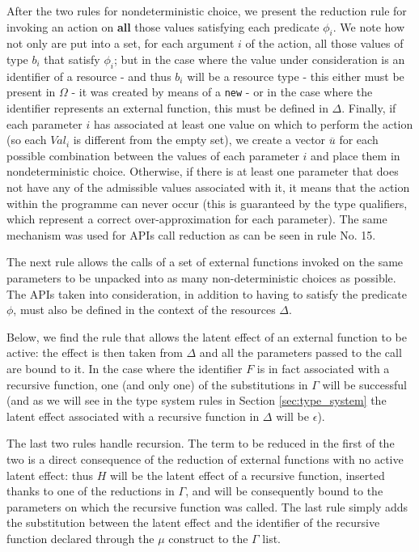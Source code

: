 After the two rules for nondeterministic choice, we present the reduction rule for invoking an action on \textbf{all} those values satisfying each predicate $\phi_i$. We note how not only are put into a set, for each argument $i$ of the action, all those values of type $b_i$ that satisfy $\phi_i$; but in the case where the value under consideration is an identifier of a resource - and thus $b_i$ will be a resource type - this either must be present in $\Omega$ - it was created by means of a \verb|new| - or in the case where the identifier represents an external function, this must be defined in $\Delta$. Finally, if each parameter $i$ has associated at least one value on which to perform the action (so each $Val_i$ is different from the empty set), we create a vector $\overline{u}$ for each possible combination between the values of each parameter $i$ and place them in nondeterministic choice. Otherwise, if there is at least one parameter that does not have any of the admissible values associated with it, it means that the action within the programme can never occur (this is guaranteed by the type qualifiers, which represent a correct over-approximation for each parameter). The same mechanism was used for APIs call reduction as can be seen in rule No. 15.

The next rule allows the calls of a set of external functions invoked on the same parameters to be unpacked into as many non-deterministic choices as possible. The APIs taken into consideration, in addition to having to satisfy the predicate $\phi$, must also be defined in the context of the resources $\Delta$.

Below, we find the rule that allows the latent effect of an external function to be active: the effect is then taken from $\Delta$ and all the parameters passed to the call are bound to it. In the case where the identifier $F$ is in fact associated with a recursive function, one (and only one) of the substitutions in $\Gamma$ will be successful (and as we will see in the type system rules in Section \ref{sec:type_system} the latent effect associated with a recursive function in $\Delta$ will be $\epsilon$).

The last two rules handle recursion. The term to be reduced in the first of the two is a direct consequence of the reduction of external functions with no active latent effect: thus $H$ will be the latent effect of a recursive function, inserted thanks to one of the reductions in $\Gamma$, and will be consequently bound to the parameters on which the recursive function was called. The last rule simply adds the substitution between the latent effect and the identifier of the recursive function declared through the $\mu$ construct to the $\Gamma$ list.

